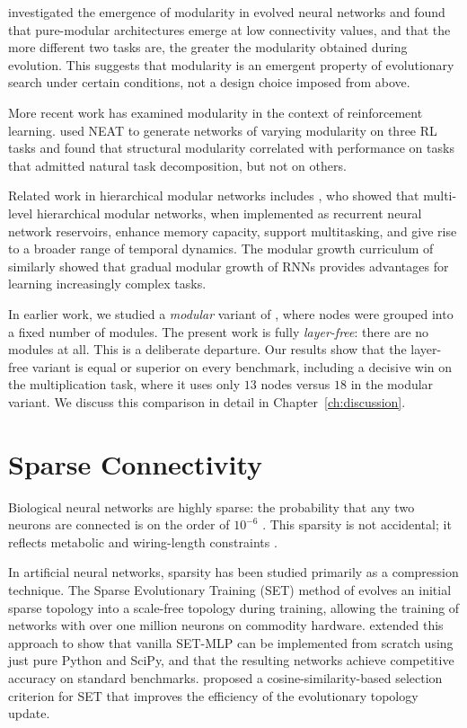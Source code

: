 \citet{landassuri2012evolution} investigated the emergence of modularity
in evolved neural networks and found that pure-modular architectures
emerge at low connectivity values, and that the more different two tasks
are, the greater the modularity obtained during evolution. This suggests
that modularity is an emergent property of evolutionary search under
certain conditions, not a design choice imposed from above.

More recent work has examined modularity in the context of reinforcement
learning. \citet{munn2024towards} used NEAT to generate networks of
varying modularity on three RL tasks and found that structural
modularity correlated with performance on tasks that admitted natural
task decomposition, but not on others.

Related work in hierarchical modular networks includes
\citet{rodriguez2025hierarchical}, who showed that multi-level
hierarchical modular networks, when implemented as recurrent neural
network reservoirs, enhance memory capacity, support multitasking, and
give rise to a broader range of temporal dynamics. The modular growth
curriculum of \citet{modulargrowth2024} similarly showed that gradual
modular growth of RNNs provides advantages for learning increasingly
complex tasks.

In earlier work, we studied a \emph{modular} variant of \modnet{},
where nodes were grouped into a fixed number of modules. The present
work is fully \emph{layer-free}: there are no modules at all. This is a
deliberate departure. Our results show that the layer-free variant is
equal or superior on every benchmark, including a decisive win on the
multiplication task, where it uses only $13$ nodes versus $18$ in the
modular variant. We discuss this comparison in detail in
Chapter~\ref{ch:discussion}.

\section{Sparse Connectivity}
\label{sec:related-sparse}

Biological neural networks are highly sparse: the probability that any
two neurons are connected is on the order of $10^{-6}$
\citep{lecun2015deep}. This sparsity is not accidental; it reflects
metabolic and wiring-length constraints \citep{cherniak1994component,
chklovskii2004wiring}.

In artificial neural networks, sparsity has been studied primarily as a
compression technique. The Sparse Evolutionary Training (SET) method of
\citet{mocanu2018scalable} evolves an initial sparse topology into a
scale-free topology during training, allowing the training of networks
with over one million neurons on commodity hardware.
\citet{liu2019sparse} extended this approach to show that vanilla
SET-MLP can be implemented from scratch using just pure Python and
SciPy, and that the resulting networks achieve competitive accuracy on
standard benchmarks. \citet{cosinesimilarity2019} proposed a
cosine-similarity-based selection criterion for SET that improves the
efficiency of the evolutionary topology update.

